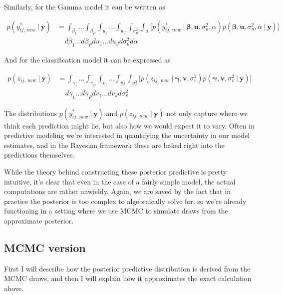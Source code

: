 \documentclass[12pt,twoside]{reedthesis}
\begin{document}
Similarly, for the Gamma model it can be written as

\[
\begin{aligned}
p(y^*_{ij, \ new} \ | \ \mathbf{y}) &=  \int_{\beta_1}  \dots \int_{\beta_P} \int_{u_1} \dots \int_{u_J} \int_{\sigma_{u}^2} \int_{\alpha} \bigg[p(y^*_{ij, \ new} \ | \ \boldsymbol{\beta}, \mathbf{u}, \sigma_{u}^2, \alpha)p(\boldsymbol{\beta}, \mathbf{u}, \sigma_{u}^2, \alpha \ | \ \mathbf{y})\bigg] \\
& \ \ \ \ \ d\beta_1 ...  d\beta_Pdu_1...du_Jd\sigma_{u}^2d\alpha
\end{aligned}
\]

And for the classification model it can be expressed as

\[
\begin{aligned}
p(z_{ij, \ new} \ | \ \mathbf{y}) &=  \int_{\gamma_1}  \dots \int_{\gamma_P} \int_{v_1} \dots \int_{v_J} \int_{\sigma_{v}^2}  \bigg[p(z_{ij, \ new} \ | \ \boldsymbol{\gamma}, \mathbf{v}, \sigma_{v}^2)p(\boldsymbol{\gamma}, \mathbf{v}, \sigma_{v}^2 \ | \ \mathbf{y})\bigg] \\
& \ \ \ \ \ d\gamma_1 ...  d\gamma_Pdv_1...dv_Jd\sigma_{v}^2
\end{aligned}
\]

The distributions \(p(y^*_{ij, \ new} \ | \ \mathbf{y})\) and \(p(z_{ij, \ new}\ | \ \mathbf{y})\) not only capture where we think each prediction might lie, but also how we would expect it to vary. Often in predictive modeling we're interested in quantifying the uncertainty in our model estimates, and in the Bayesian framework these are baked right into the predictions themselves.

While the theory behind constructing these posterior predictive is pretty intuitive, it's clear that even in the case of a fairly simple model, the actual computations are rather unwieldy. Again, we are saved by the fact that in practice the posterior is too complex to algebraically solve for, so we're already functioning in a setting where we use MCMC to simulate draws from the approximate posterior.

\hypertarget{mcmc-version}{%
\subsection{MCMC version}\label{mcmc-version}}

First I will describe how the posterior predictive distribution is derived from the MCMC draws, and then I will explain how it approximates the exact calculation above.
\end{document}
